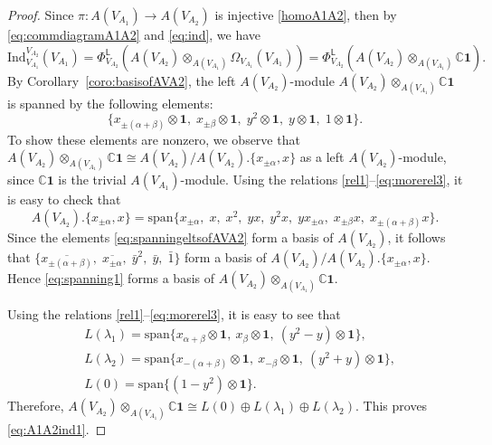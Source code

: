 \documentclass[12pt,a4paper,reqno]{amsart}
\numberwithin{equation}{section}
\numberwithin{equation}{section}
\theoremstyle{definition}
\def \ra {\rightarrow}
\def \C {\mathbb{C}}
\def\la{\lambda}
\def \al{\alpha}
\def \b {\beta}
\def \op {\oplus}
\def \vac {\mathbf{1}}
\def\Ind{\mathrm{Ind}}
\def\L{\mathcal{L}}
\def\o{\otimes}
\def\spn{\mathrm{span}}
\def\Om{\Omega}
\def\Ind{\mathrm{Ind}}
\def\L{\mathsf{L}}
\def\L{\mathsf{L}}
\begin{document}
	\begin{proof}
		Since $\pi: A(V_{A_1})\ra A(V_{A_2})$ is injective \eqref{homoA1A2}, then by \eqref{eq:commdiagramA1A2} and \eqref{eq:ind}, we have 
		$$
		\Ind^{V_{A_2}}_{V_{A_1}}(V_{A_1})=\Phi^\L_{V_{A_2}}\left(A(V_{A_2})\o _{A(V_{A_1})} \Om_{V_{A_1}}(V_{A_1})\right)=\Phi^\L_{V_{A_2}}\left(A(V_{A_2})\o _{A(V_{A_1})}\C \vac\right). 
		$$
		By Corollary~\ref{coro:basisofAVA2}, the left $A(V_{A_2})$-module $A(V_{A_2})\o _{A(V_{A_1})}\C \vac$ is spanned by the following elements: 
		\begin{equation}\label{eq:spanning1}
			\{ x_{\pm (\al+\b)}\o \vac,\; x_{\pm \b}\o \vac,\; y^2\o \vac,\; y\o \vac,\; 1\o \vac \}.
		\end{equation}
		To show these elements are nonzero, we observe that $A(V_{A_2})\o _{A(V_{A_1})}\C \vac\cong A(V_{A_2})/A(V_{A_2}).\{x_{\pm \al} ,x\}$ as a left $A(V_{A_2})$-module, since $\C \vac$ is the trivial $A(V_{A_1})$-module. Using the relations \eqref{rel1}--\eqref{eq:morerel3}, it is easy to check that 
		$$
		A(V_{A_2}).\{ x_{\pm \al},x\}=\spn\{ x_{\pm \alpha},\; x,\; x^2,\; yx,\;  y^2x,\; yx_{\pm \alpha},\; x_{\pm \beta}x,\; x_{\pm (\alpha+\beta)}x\}.
		$$
		Since the elements \eqref{eq:spanningeltsofAVA2} form a basis of $A(V_{A_2})$, it follows that $\{\overline{x_{\pm (\al+\b)}},\; \overline{x_{\pm \al}},\; \bar{y}^2,\; \bar{y},\; \bar{1} \}$ form a basis of $A(V_{A_2})/A(V_{A_2}).\{x_{\pm \al} ,x\}$. Hence \eqref{eq:spanning1} forms a basis of $A(V_{A_2})\o _{A(V_{A_1})}\C \vac$. 
		
		Using the relations \eqref{rel1}--\eqref{eq:morerel3}, it is easy to see that 
		\begin{align*}
			&L(\la_1)=\spn\{x_{\al+\b}\o \vac,\ x_\b\o \vac,\ (y^2-y)\o \vac \},\\
			& L(\la_2)=\spn\{x_{-(\al+\b)}\o \vac,\ x_{-\b}\o \vac,\ (y^2+y)\o\vac  \},\\
			& L(0)=\spn\{(1-y^2)\o \vac \}.
		\end{align*}
		Therefore, $A(V_{A_2})\o _{A(V_{A_1})}\C \vac\cong L(0)\op L(\la_1)\op L(\la_2)$. This proves \eqref{eq:A1A2ind1}.
		

\end{proof}
\end{document}
